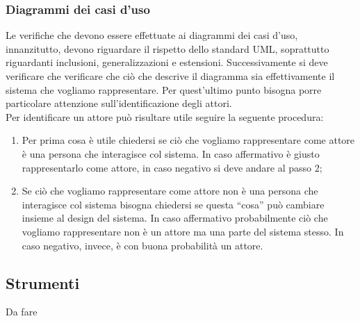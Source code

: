 \documentclass[../NormeProgetto.tex]{subfiles}
\begin{document}
				\subsubsection{Diagrammi dei casi d'uso}
				Le verifiche che devono essere effettuate ai diagrammi dei casi d'uso, innanzitutto, devono riguardare il rispetto dello standard UML, soprattutto riguardanti inclusioni, generalizzazioni e estensioni. Successivamente si deve verificare che verificare che ciò che descrive il diagramma sia effettivamente il sistema che vogliamo rappresentare. Per quest'ultimo punto bisogna porre particolare attenzione sull'identificazione degli attori. \\ Per identificare un attore può risultare utile seguire la seguente procedura:
				\begin{enumerate}
					\item Per prima cosa è utile chiedersi se ciò che vogliamo rappresentare come attore è una persona che interagisce col sistema. In caso affermativo è giusto rappresentarlo come attore, in caso negativo si deve andare al passo 2;
					\item Se ciò che vogliamo rappresentare come attore non è una persona che interagisce col sistema bisogna chiedersi se questa ``cosa'' può cambiare insieme al design del sistema. In caso affermativo probabilmente ciò che vogliamo rappresentare non è un attore ma una parte del sistema stesso. In caso negativo, invece, è con buona probabilità un attore.
				\end{enumerate}
	\subsection{Strumenti} \label{sec:Strumenti}
	Da fare
\end{document}
